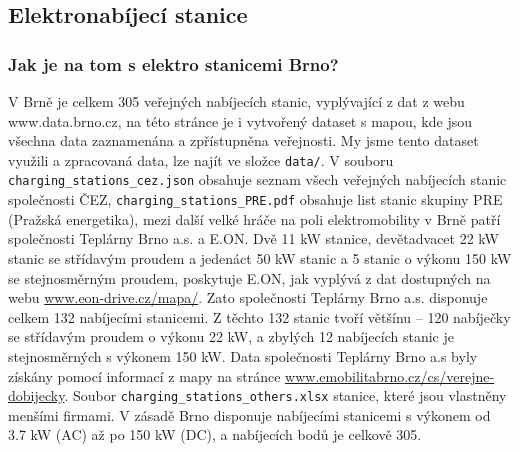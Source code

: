 \documentclass[a4paper,11pt]{article}
\begin{document}
\subsection{Elektronabíjecí stanice}

\subsubsection{Jak je na tom s elektro stanicemi Brno?}
\label{sec:stanice}
V Brně je celkem 305 veřejných nabíjecích stanic, vyplývající z dat z webu www.data.brno.cz\cite{data_brno},
na této stránce je i vytvořený dataset s mapou, kde jsou všechna data zaznamenána a zpřístupněna veřejnosti.
My jsme tento dataset využili a zpracovaná data, lze najít ve složce \texttt{data/}. V souboru \texttt{charging\_stations\_cez.json}
obsahuje seznam všech veřejných nabíjecích stanic společnosti ČEZ, \texttt{charging\_stations\_PRE.pdf} obsahuje
list stanic skupiny PRE (Pražská energetika), mezi další velké hráče na poli elektromobility v Brně patří společnosti
Teplárny Brno a.s. a E.ON. Dvě 11 kW stanice, devětadvacet 22 kW stanic se střídavým proudem a jedenáct 50 kW stanic 
a 5 stanic o výkonu 150 kW se stejnosměrným proudem, poskytuje E.ON, jak vyplývá z dat dostupných na webu 
\href{https://www.eon-drive.cz/mapa/}{www.eon-drive.cz/mapa/}. Zato společnosti Teplárny Brno a.s. disponuje celkem 
132 nabíjecími stanicemi. Z těchto 132 stanic tvoří většínu -- 120 nabíječky se střídavým proudem o výkonu 22 kW, 
a zbylých 12 nabíjecích stanic je stejnosměrných s výkonem 150 kW. Data společnosti Teplárny Brno a.s byly získány pomocí informací 
z mapy na stránce \href{https://www.emobilitabrno.cz/cs/verejne-dobijecky}{www.emobilitabrno.cz/cs/verejne-dobijecky}.
Soubor \texttt{charging\_stations\_others.xlsx} stanice, které jsou vlastněny menšími firmami.
V zásadě Brno disponuje nabíjecími stanicemi s výkonem od 3.7 kW (AC) až po 150 kW (DC), a nabíjecích bodů je 
celkově 305. \cite{eon_data, emobilita_data}
\end{document}
